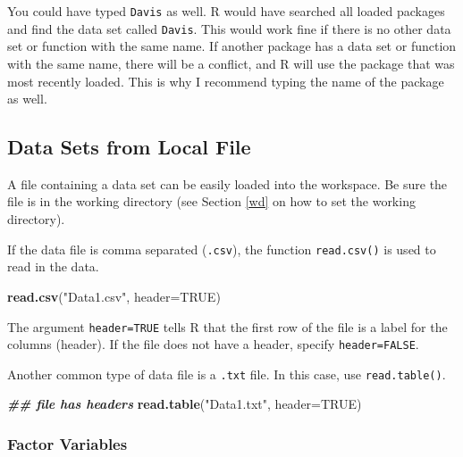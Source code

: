 \documentclass[
]{book}
\newenvironment{Shaded}{\begin{snugshade}}{\end{snugshade}}
\newcommand{\AttributeTok}[1]{\textcolor[rgb]{0.13,0.29,0.53}{#1}}
\newcommand{\ConstantTok}[1]{\textcolor[rgb]{0.56,0.35,0.01}{#1}}
\newcommand{\DocumentationTok}[1]{\textcolor[rgb]{0.56,0.35,0.01}{\textbf{\textit{#1}}}}
\newcommand{\FunctionTok}[1]{\textcolor[rgb]{0.13,0.29,0.53}{\textbf{#1}}}
\newcommand{\NormalTok}[1]{#1}
\newcommand{\StringTok}[1]{\textcolor[rgb]{0.31,0.60,0.02}{#1}}
\theoremstyle{definition}
\theoremstyle{definition}
\theoremstyle{definition}
\theoremstyle{definition}
\theoremstyle{remark}
\begin{document}
You could have typed \texttt{Davis} as well. R would have searched all loaded packages and find the data set called \texttt{Davis}. This would work fine if there is no other data set or function with the same name. If another package has a data set or function with the same name, there will be a conflict, and R will use the package that was most recently loaded. This is why I recommend typing the name of the package as well.

\hypertarget{data-sets-from-local-file}{%
\subsection{Data Sets from Local File}\label{data-sets-from-local-file}}

A file containing a data set can be easily loaded into the workspace. Be sure the file is in the working directory (see Section \ref{wd} on how to set the working directory).

If the data file is comma separated (\texttt{.csv}), the function \texttt{read.csv()} is used to read in the data.

\begin{Shaded}
\begin{Highlighting}[]
\FunctionTok{read.csv}\NormalTok{(}\StringTok{"Data1.csv"}\NormalTok{, }\AttributeTok{header=}\ConstantTok{TRUE}\NormalTok{)}
\end{Highlighting}
\end{Shaded}

The argument \texttt{header=TRUE} tells R that the first row of the file is a label for the columns (header). If the file does not have a header, specify \texttt{header=FALSE}.

Another common type of data file is a \texttt{.txt} file. In this case, use \texttt{read.table()}.

\begin{Shaded}
\begin{Highlighting}[]
\DocumentationTok{\#\# file has headers}
\FunctionTok{read.table}\NormalTok{(}\StringTok{"Data1.txt"}\NormalTok{, }\AttributeTok{header=}\ConstantTok{TRUE}\NormalTok{) }
\end{Highlighting}
\end{Shaded}

\hypertarget{factor-variables}{%
\subsubsection{Factor Variables}\label{factor-variables}}
\end{document}
